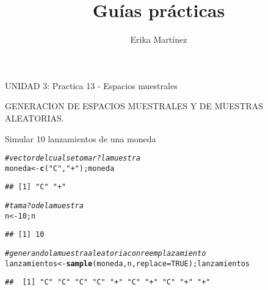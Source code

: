 \documentclass[10pt,a4paper]{article}\usepackage[]{graphicx}\usepackage[]{color}
\author{Erika Martínez}
\title{Guías prácticas}
\makeatletter
\newcommand{\hlnum}[1]{\textcolor[rgb]{0.686,0.059,0.569}{#1}}%
\newcommand{\hlstr}[1]{\textcolor[rgb]{0.192,0.494,0.8}{#1}}%
\newcommand{\hlcom}[1]{\textcolor[rgb]{0.678,0.584,0.686}{\textit{#1}}}%
\newcommand{\hlstd}[1]{\textcolor[rgb]{0.345,0.345,0.345}{#1}}%
\newcommand{\hlkwb}[1]{\textcolor[rgb]{0.69,0.353,0.396}{#1}}%
\newcommand{\hlkwc}[1]{\textcolor[rgb]{0.333,0.667,0.333}{#1}}%
\newcommand{\hlkwd}[1]{\textcolor[rgb]{0.737,0.353,0.396}{\textbf{#1}}}%
\newenvironment{kframe}{%
 \def\at@end@of@kframe{}%
 \ifinner\ifhmode%
  \def\at@end@of@kframe{\end{minipage}}%
  \begin{minipage}{\columnwidth}%
 \fi\fi%
 \def\FrameCommand##1{\hskip\@totalleftmargin \hskip-\fboxsep
 \colorbox{shadecolor}{##1}\hskip-\fboxsep
     \hskip-\linewidth \hskip-\@totalleftmargin \hskip\columnwidth}%
 \MakeFramed {\advance\hsize-\width
   \@totalleftmargin\z@ \linewidth\hsize
   \@setminipage}}%
 {\par\unskip\endMakeFramed%
 \at@end@of@kframe}
\newenvironment{knitrout}{}{} %
\makeatother
\begin{document}
\maketitle
\newpage

UNIDAD 3: Practica 13 - Espacios muestrales

GENERACION DE ESPACIOS MUESTRALES Y DE MUESTRAS ALEATORIAS.

Simular 10 lanzamientos de una moneda 
\begin{knitrout}
\color{fgcolor}\begin{kframe}
\begin{alltt}
\hlcom{# vector del cual se tomar? la muestra }
\hlstd{moneda} \hlkwb{<-} \hlkwd{c}\hlstd{(}\hlstr{"C"}\hlstd{,} \hlstr{"+"}\hlstd{); moneda}
\end{alltt}
\begin{verbatim}
## [1] "C" "+"
\end{verbatim}
\begin{alltt}
\hlcom{# tama?o de la muestra }
\hlstd{n} \hlkwb{<-} \hlnum{10}\hlstd{; n}
\end{alltt}
\begin{verbatim}
## [1] 10
\end{verbatim}
\begin{alltt}
\hlcom{#generando la muestra aleatoria con reemplazamiento}
\hlstd{lanzamientos} \hlkwb{<-} \hlkwd{sample}\hlstd{(moneda, n,} \hlkwc{replace}\hlstd{=}\hlnum{TRUE}\hlstd{); lanzamientos}
\end{alltt}
\begin{verbatim}
##  [1] "C" "C" "C" "C" "+" "C" "+" "C" "+" "+"
\end{verbatim}
\end{kframe}
\end{knitrout}
\end{document}
